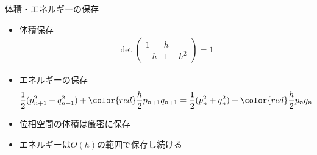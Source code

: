 \begin{frame}[t,fragile]{体積・エネルギーの保存}
  \begin{itemize}
  \item 体積保存
    \begin{align*}
      \det \begin{pmatrix} 1 & h \\ -h & 1-h^2 \end{pmatrix} = 1
    \end{align*}
  \item エネルギーの保存
    \begin{align*}
      \frac{1}{2}(p_{n+1}^2+q_{n+1}^2) + {\color{red}\frac{h}{2} p_{n+1} q_{n+1}} = \frac{1}{2}(p_{n}^2+q_{n}^2) + {\color{red}\frac{h}{2} p_{n} q_{n}}
    \end{align*}
  \item 位相空間の体積は厳密に保存
  \item エネルギーは$O(h)$の範囲で保存し続ける
  \end{itemize}
\end{frame}
